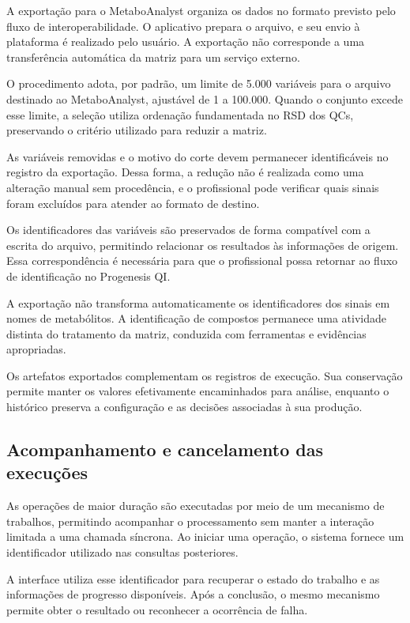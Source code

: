 A exportação para o MetaboAnalyst organiza os dados no formato previsto pelo fluxo de interoperabilidade. O aplicativo prepara o arquivo, e seu envio à plataforma é realizado pelo usuário. A exportação não corresponde a uma transferência automática da matriz para um serviço externo.

O procedimento adota, por padrão, um limite de 5.000 variáveis para o arquivo destinado ao MetaboAnalyst, ajustável de 1 a 100.000. Quando o conjunto excede esse limite, a seleção utiliza ordenação fundamentada no RSD dos QCs, preservando o critério utilizado para reduzir a matriz.

As variáveis removidas e o motivo do corte devem permanecer identificáveis no registro da exportação. Dessa forma, a redução não é realizada como uma alteração manual sem procedência, e o profissional pode verificar quais sinais foram excluídos para atender ao formato de destino.

Os identificadores das variáveis são preservados de forma compatível com a escrita do arquivo, permitindo relacionar os resultados às informações de origem. Essa correspondência é necessária para que o profissional possa retornar ao fluxo de identificação no Progenesis QI.

A exportação não transforma automaticamente os identificadores dos sinais em nomes de metabólitos. A identificação de compostos permanece uma atividade distinta do tratamento da matriz, conduzida com ferramentas e evidências apropriadas.

Os artefatos exportados complementam os registros de execução. Sua conservação permite manter os valores efetivamente encaminhados para análise, enquanto o histórico preserva a configuração e as decisões associadas à sua produção.

\subsection{Acompanhamento e cancelamento das execuções}
\label{subsec:acompanhamento-cancelamento}

As operações de maior duração são executadas por meio de um mecanismo de trabalhos, permitindo acompanhar o processamento sem manter a interação limitada a uma chamada síncrona. Ao iniciar uma operação, o sistema fornece um identificador utilizado nas consultas posteriores.

A interface utiliza esse identificador para recuperar o estado do trabalho e as informações de progresso disponíveis. Após a conclusão, o mesmo mecanismo permite obter o resultado ou reconhecer a ocorrência de falha.


